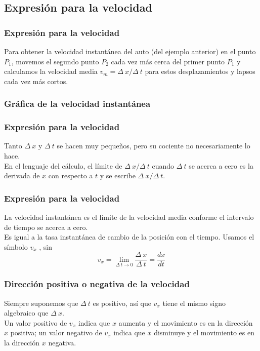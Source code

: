 \subsection*{Expresión para la velocidad}
\begin{frame}
\frametitle{Expresión para la velocidad}
Para obtener la velocidad instantánea del auto (del ejemplo anterior) en el punto $P_{1}$, movemos el segundo punto $P_{2}$ cada vez más cerca del primer punto $P_{1}$ y calculamos la
velocidad media $v_{m} = \Delta \: x / \Delta \: t$ para estos desplazamientos y lapsos cada vez más cortos.
\end{frame}
\begin{frame}[plain]
\frametitle{Gráfica de la velocidad instantánea}
\begin{figure}
    \centering
    \end{figure}
\end{frame}
\begin{frame}
\frametitle{Expresión para la velocidad}
Tanto $\Delta \: x$ y $\Delta \: t$ se hacen muy pequeños,  pero su cociente no necesariamente lo hace.
\\
\bigskip
\pause
En el lenguaje del cálculo, el límite de $\Delta \: x / \Delta \: t$ cuando $\Delta \: t$ se acerca a cero es la derivada de $x$ con respecto a $t$ y se escribe $\Delta \: x/ \Delta \: t$.
\end{frame}
\begin{frame}
\frametitle{Expresión para la velocidad}
La velocidad instantánea es el límite de la velocidad media conforme el intervalo de tiempo se acerca a cero.
\\
\bigskip
\pause
Es igual a la tasa instantánea de cambio de la posición con el tiempo. Usamos el símbolo $v_{x}$ , sin
\[ v_{x} = \lim_{\Delta \: t \to 0} \dfrac{\Delta \: x}{\Delta \: t} = \dfrac{dx}{dt} \]
\end{frame}
\begin{frame}
\frametitle{Dirección positiva o negativa de la velocidad}
Siempre suponemos que $\Delta \: t$ es positivo, así que $v_{x}$ tiene el mismo signo algebraico que $\Delta \: x$.
\\
\bigskip
\pause
Un valor positivo de $v_{x}$ indica que $x$ aumenta y el movimiento es en la dirección $x$ positiva; un valor negativo de $v_{x}$ indica que $x$ disminuye y el movimiento
es en la dirección $x$ negativa.
\end{frame}

